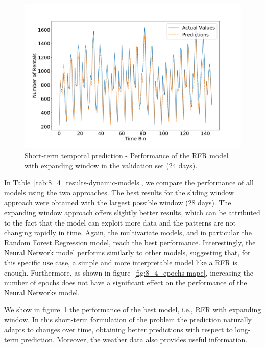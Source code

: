 \begin{figure}
    \begin{center}
            \includegraphics[width=0.65\columnwidth]{figures/temporal_analyses/RandomForestExpandingPredictions.pdf}
        \caption{Short-term temporal prediction - Performance of the RFR model with expanding window in the validation set (24 days).}
            \label{fig:8_4_random-forests-dynamic}

    \end{center}
\end{figure}


In Table~\ref{tab:8_4_results-dynamic-models}, we compare the performance of all models using the two approaches. The best results for the sliding window approach were obtained with the largest possible window (28 days). The expanding window approach offers slightly better results, which can be attributed to the fact that the model can exploit more data and the patterns are not changing rapidly in time. Again, the multivariate models, and in particular the Random Forest Regression model, reach the best performance. Interestingly, the Neural Network model performs similarly to other models, suggesting that, for this specific use case, a simple and more interpretable model like a RFR is enough.
Furthermore, as shown in figure~\ref{fig:8_4_epochs-mape}, increasing the number of epochs does not have a significant effect on the performance of the Neural Networks model.

We show in figure~\ref{fig:8_4_random-forests-dynamic} the performance of the best model, i.e., RFR with expanding window. In this short-term formulation of the problem the prediction naturally adapts to changes over time, obtaining better predictions with respect to long-term prediction. Moreover, the weather data also provides useful information. 



